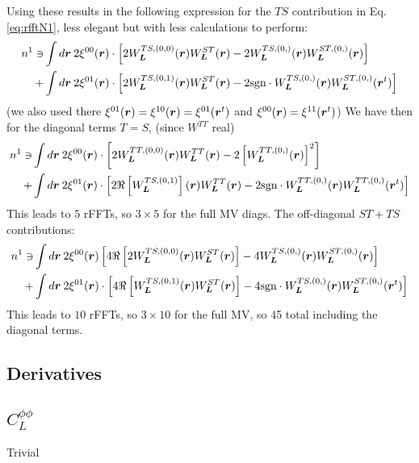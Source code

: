 \documentclass[11pt]{article}
\begin{document}
Using these results in the following expression for the $TS$ contribution in Eq.\ref{eq:rfftN1}, less elegant but with less calculations to perform:
\begin{equation}
\begin{split}
n^{1} \ni	&\int d\boldsymbol{r} \: 2\xi^{00}(\boldsymbol{r}) \cdot \left[2W_{\boldsymbol{L}}^{TS, (0, 0)}(\boldsymbol{r}) W_{\boldsymbol{L}}^{ST}(\boldsymbol{r})- 2 W_{\boldsymbol{L}}^{TS, (0,)}(\boldsymbol{r})W_{\boldsymbol{L}}^{ST, (0,)}(\boldsymbol{r})\right] \\
	+&\int d\boldsymbol{r} \: 2\xi^{01}(\boldsymbol{r})\cdot\left[ 2 W_{\boldsymbol{L}}^{TS, (0,1)}(\boldsymbol{r}) W_{\boldsymbol{L}}^{ST}(\boldsymbol{r}) - 2\textrm{sgn}\cdot W_{\boldsymbol{L}}^{TS, (0,)}(\boldsymbol{r})W_{\boldsymbol{L}}^{ST, (0,)}(\boldsymbol{r}^t)\right]
\end{split}
\end{equation}
(we also used there $\xi^{01}(\boldsymbol{r}) = \xi^{10}(\boldsymbol{r}) = \xi^{01}(\boldsymbol{r}^t)$ and $\xi^{00}(\boldsymbol{r}) = \xi^{11}(\boldsymbol{r}^t)$)
We have then for the diagonal terms $T=S$, (since $W^{TT}$ real)
\begin{equation}
\begin{split}
	n^{1} \ni	&\int d\boldsymbol{r} \: 2\xi^{00}(\boldsymbol{r}) \cdot \left[2W_{\boldsymbol{L}}^{TT, (0, 0)}(\boldsymbol{r}) W_{\boldsymbol{L}}^{TT}(\boldsymbol{r})- 2 \left[W_{\boldsymbol{L}}^{TT, (0,)}(\boldsymbol{r})\right]^2\right] \\
	+&\int d\boldsymbol{r} \: 2\xi^{01}(\boldsymbol{r})\cdot\left[ 2 \Re\left[{W_{\boldsymbol{L}}^{TS, (0,1)}}\right](\boldsymbol{r}) W_{\boldsymbol{L}}^{TT}(\boldsymbol{r}) - 2\textrm{sgn}\cdot W_{\boldsymbol{L}}^{TT, (0,)}(\boldsymbol{r})W_{\boldsymbol{L}}^{TT, (0,)}(\boldsymbol{r}^t)\right]
	\end{split}
\end{equation}
This leads to $5$ rFFTs, so $3\times 5$ for the full MV diags. The off-diagonal $ST + TS $ contributions:
\begin{equation}
\begin{split}
n^{1} \ni	&\int d\boldsymbol{r} \:2 \xi^{00}(\boldsymbol{r})\left[ 4\Re \left[2W_{\boldsymbol{L}}^{TS, (0, 0)}(\boldsymbol{r}) W_{\boldsymbol{L}}^{ST}(\boldsymbol{r})\right]- 4 W_{\boldsymbol{L}}^{TS, (0,)}(\boldsymbol{r})W_{\boldsymbol{L}}^{ST, (0,)}(\boldsymbol{r})\right] \\
	+&\int d\boldsymbol{r} \: 2\xi^{01}(\boldsymbol{r})\cdot\left[ 4\Re\left[ W_{\boldsymbol{L}}^{TS, (0,1)}(\boldsymbol{r}) W_{\boldsymbol{L}}^{ST}(\boldsymbol{r})\right] - 4\textrm{sgn}\cdot W_{\boldsymbol{L}}^{TS, (0,)}(\boldsymbol{r})W_{\boldsymbol{L}}^{ST, (0,)}(\boldsymbol{r}^t)\right]
\end{split}
\end{equation}
This leads to $10 $ rFFTs, so $3\times 10$ for the full MV, so 45 total including the diagonal terms.

\subsection{Derivatives}
\subsection{$C_L^{\phi\phi}$}
Trivial
\end{document}
